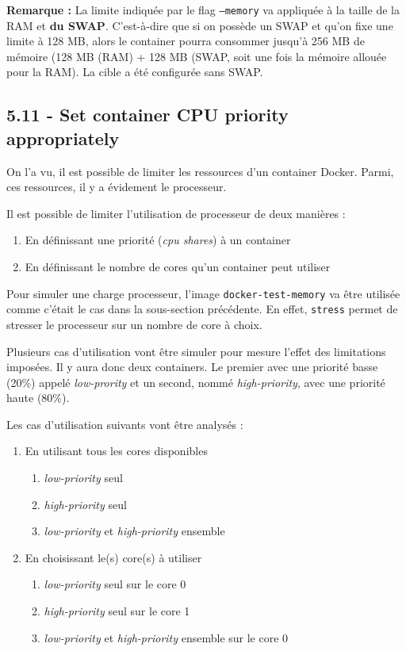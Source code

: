 \documentclass[11pt,a4paper,oneside]{report}
\newcommand{\code}[1]{\texttt{#1}}
\begin{document}
\textbf{Remarque :} La limite indiquée par le flag \code{--memory} va appliquée à la taille de la RAM et \textbf{du SWAP}\cite{marek_goldmann_res_mgmt}. C'est-à-dire que si on possède un SWAP et qu'on fixe une limite à 128 MB, alors le container pourra consommer jusqu'à 256 MB de mémoire (128 MB (RAM) + 128 MB (SWAP, soit une fois la mémoire allouée pour la RAM). La cible a été configurée sans SWAP.


\subsection{5.11 - Set container CPU priority appropriately}
On l'a vu, il est possible de limiter les ressources d'un container Docker. Parmi, ces ressources, il y a évidement le processeur.

Il est possible de limiter l'utilisation de processeur de deux manières :
\begin{enumerate}
\item En définissant une priorité (\textit{cpu shares}) à un container
\item En définissant le nombre de cores qu'un container peut utiliser
\end{enumerate}

Pour simuler une charge processeur, l'image \code{docker-test-memory} va être utilisée comme c'était le cas dans la sous-section précédente. En effet, \code{stress} permet de stresser le processeur sur un nombre de core à choix.

Plusieurs cas d'utilisation vont être simuler pour mesure l'effet des limitations imposées. Il y aura donc deux containers. Le premier avec une priorité basse (20\%) appelé \textit{low-prority} et un second, nommé \textit{high-priority}, avec une priorité haute (80\%).

Les cas d'utilisation suivants vont être analysés :
\begin{enumerate}
	\item En utilisant tous les cores disponibles
	\begin{enumerate}
		\item \textit{low-priority} seul
		\item \textit{high-priority} seul
		\item \textit{low-priority} et \textit{high-priority} ensemble
	\end{enumerate}
	
    \item En choisissant le(s) core(s) à utiliser
	\begin{enumerate}
		\item \textit{low-priority} seul sur le core 0
		\item \textit{high-priority} seul sur le core 1
		\item \textit{low-priority} et \textit{high-priority} ensemble sur le core 0
    \end{enumerate}
\end{enumerate}
\end{document}
